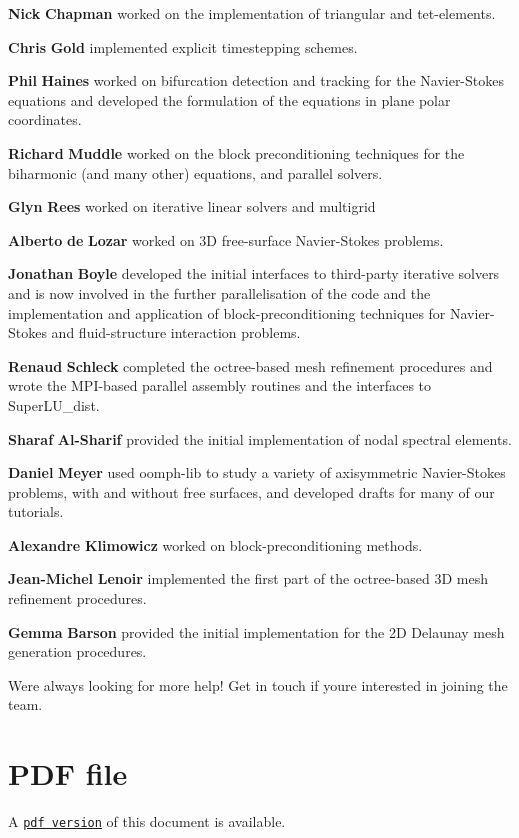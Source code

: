 \begin{DoxyItemize}
\item {\bfseries Nick} {\bfseries Chapman} worked on the implementation of triangular and tet-\/elements.
\item {\bfseries Chris} {\bfseries Gold} implemented explicit timestepping schemes.
\item {\bfseries Phil} {\bfseries Haines} worked on bifurcation detection and tracking for the Navier-\/\+Stokes equations and developed the formulation of the equations in plane polar coordinates.
\item {\bfseries Richard} {\bfseries Muddle} worked on the block preconditioning techniques for the biharmonic (and many other) equations, and parallel solvers.
\item {\bfseries Glyn} {\bfseries Rees} worked on iterative linear solvers and multigrid
\item {\bfseries Alberto} {\bfseries de} {\bfseries Lozar} worked on 3D free-\/surface Navier-\/\+Stokes problems.
\item {\bfseries Jonathan} {\bfseries Boyle} developed the initial interfaces to third-\/party iterative solvers and is now involved in the further parallelisation of the code and the implementation and application of block-\/preconditioning techniques for Navier-\/\+Stokes and fluid-\/structure interaction problems.
\item {\bfseries Renaud} {\bfseries Schleck} completed the octree-\/based mesh refinement procedures and wrote the M\+P\+I-\/based parallel assembly routines and the interfaces to Super\+L\+U\+\_\+dist.
\item {\bfseries Sharaf} {\bfseries Al-\/\+Sharif} provided the initial implementation of nodal spectral elements.
\item {\bfseries Daniel} {\bfseries Meyer} used oomph-\/lib to study a variety of axisymmetric Navier-\/\+Stokes problems, with and without free surfaces, and developed drafts for many of our tutorials.
\item {\bfseries Alexandre} {\bfseries Klimowicz} worked on block-\/preconditioning methods.
\item {\bfseries Jean-\/\+Michel} {\bfseries Lenoir} implemented the first part of the octree-\/based 3D mesh refinement procedures.
\item {\bfseries Gemma} {\bfseries Barson} provided the initial implementation for the 2D Delaunay mesh generation procedures.
\end{DoxyItemize}

We\textquotesingle{}re always looking for more help! Get in touch if you\textquotesingle{}re interested in joining the team.



 

 \hypertarget{index_pdf}{}\section{P\+D\+F file}\label{index_pdf}
A \href{../latex/refman.pdf}{\tt pdf version} of this document is available. 
